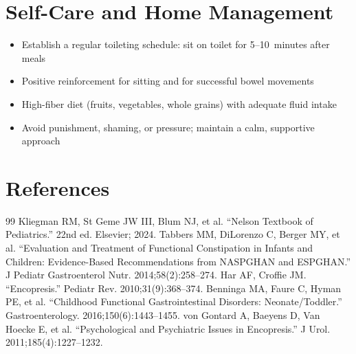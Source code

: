 \section*{Self-Care and Home Management}
\begin{itemize}
  \item Establish a regular toileting schedule: sit on toilet for 5--10~minutes after meals
  \item Positive reinforcement for sitting and for successful bowel movements
  \item High-fiber diet (fruits, vegetables, whole grains) with adequate fluid intake
  \item Avoid punishment, shaming, or pressure; maintain a calm, supportive approach
\end{itemize}

\section*{References}
\begin{thebibliography}{99}
 Kliegman RM, St Geme JW III, Blum NJ, et al. ``Nelson Textbook of Pediatrics.'' 22nd ed. Elsevier; 2024.
 Tabbers MM, DiLorenzo C, Berger MY, et al. ``Evaluation and Treatment of Functional Constipation in Infants and Children: Evidence-Based Recommendations from NASPGHAN and ESPGHAN.'' J Pediatr Gastroenterol Nutr. 2014;58(2):258--274.
 Har AF, Croffie JM. ``Encopresis.'' Pediatr Rev. 2010;31(9):368--374.
 Benninga MA, Faure C, Hyman PE, et al. ``Childhood Functional Gastrointestinal Disorders: Neonate/Toddler.'' Gastroenterology. 2016;150(6):1443--1455.
 von Gontard A, Baeyens D, Van Hoecke E, et al. ``Psychological and Psychiatric Issues in Encopresis.'' J Urol. 2011;185(4):1227--1232.
\end{thebibliography}
